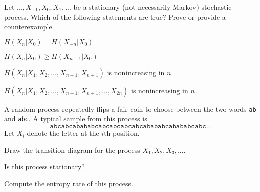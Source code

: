 \documentclass[a4paper,10pt,landscape,twocolumn]{scrartcl}
\begin{document}
\begin{exercise} Let $..., X_{-1}, X_0, X_1, ...$ be a stationary (not necessarily Markov) stochastic process. Which of the following statements are true? Prove or provide a counterexample.
\begin{subex}
$H(X_n|X_0) = H(X_{-n}|X_0)$
\end{subex}
\begin{subex}
$H(X_n|X_0) \geq H(X_{n-1}|X_0)$
\end{subex}
\begin{subex}
$H(X_n|X_1, X_2, ..., X_{n-1}, X_{n+1})$ is nonincreasing in $n$.
\end{subex}
\begin{subex}
$H(X_n|X_1, X_2, ..., X_{n-1}, X_{n+1}, ..., X_{2n})$ is nonincreasing in $n$.
\end{subex}
\end{exercise}


\begin{exercise}
A random process repeatedly flips a fair coin to choose between the two words \texttt{ab} and \texttt{abc}. A typical sample from this process is
\[
\mathtt{a b c a b c a b a b a b c a b c a b c a b c a b c a b a b a b c a b a b a b c a b c ...}
\]
Let $X_i$ denote the letter at the $i$th position.
\begin{subex}
Draw the transition diagram for the process $X_1, X_2, X_3, ...$.
\end{subex}
\begin{subex}
Is this process stationary?
\end{subex}
\begin{subex}
Compute the entropy rate of this process.
\end{subex}
\end{exercise}
\end{document}
